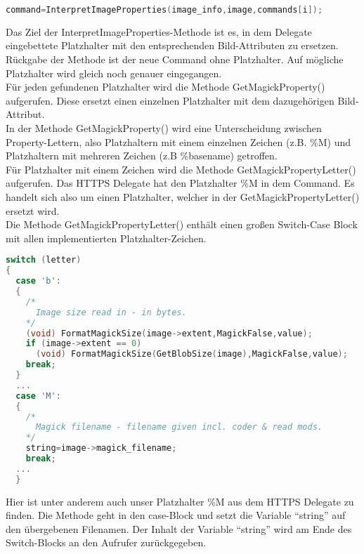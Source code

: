 \begin{lstlisting}[firstnumber=1295, language=C, caption=magick/delegates.c InvokeDelegate() InterpretImageProperties() Aufruf,label={lst:delegatesinterpretcall}]
command=InterpretImageProperties(image_info,image,commands[i]);
\end{lstlisting}
\vspace{5mm}

Das Ziel der InterpretImageProperties-Methode ist es, in dem Delegate eingebettete Platzhalter mit den entsprechenden Bild-Attributen zu ersetzen.
Rückgabe der Methode ist der neue Command ohne Platzhalter.
Auf mögliche Platzhalter wird gleich noch genauer eingegangen.\\

Für jeden gefundenen Platzhalter wird die Methode GetMagickProperty() aufgerufen.
Diese ersetzt einen einzelnen Platzhalter mit dem dazugehörigen Bild-Attribut.\\

In der Methode GetMagickProperty() wird eine Unterscheidung zwischen Property-Lettern,
also Platzhaltern mit einem einzelnen Zeichen (z.B. \%M) und Platzhaltern mit mehreren Zeichen (z.B \%basename) getroffen.\\

Für Platzhalter mit einem Zeichen wird die Methode GetMagickPropertyLetter() aufgerufen.
Das HTTPS Delegate hat den Platzhalter \%M in dem Command.
Es handelt sich also um einen Platzhalter, welcher in der GetMagickPropertyLetter() ersetzt wird.\\

Die Methode GetMagickPropertyLetter() enthält einen großen Switch-Case Block mit allen implementierten Platzhalter-Zeichen.

\begin{lstlisting}[language=C, caption=magick/property.c GetMagickPropertyLetter Switch über mögliche Platzhalter,label={lst:propertyswitch}]
switch (letter)
{
  case 'b':
  {
    /*
      Image size read in - in bytes.
    */
    (void) FormatMagickSize(image->extent,MagickFalse,value);
    if (image->extent == 0)
      (void) FormatMagickSize(GetBlobSize(image),MagickFalse,value);
    break;
  }
  ...
  case 'M':
  {
    /*
      Magick filename - filename given incl. coder & read mods.
    */
    string=image->magick_filename;
    break;
  ...
  }
\end{lstlisting}
\vspace{5mm}

Hier ist unter anderem auch unser Platzhalter \%M aus dem HTTPS Delegate zu finden.
Die Methode geht in den case-Block und setzt die Variable "`string"' auf den übergebenen Filenamen.
Der Inhalt der Variable "`string"' wird am Ende des Switch-Blocks an den Aufrufer zurückgegeben.\\

